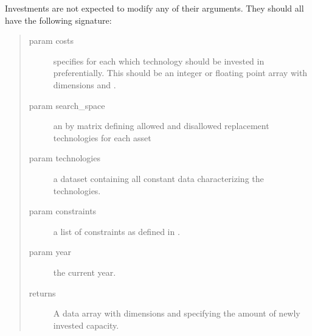 \documentclass[letterpaper,10pt,english]{sphinxmanual}
\begin{document}
Investments are not expected to modify any of their arguments. They should all
have the following signature:

\begin{sphinxVerbatim}[commandchars=\\\{\}]
 
     
     
     
     \PYG{p}{[}\PYG{p}{]}
     
  
\end{sphinxVerbatim}
\begin{quote}\begin{description}
\item[{param costs}] \leavevmode
specifies for each  which  technology should be invested
in preferentially. This should be an integer or floating point array with
dimensions  and .

\item[{param search\_space}] \leavevmode
an  by  matrix defining allowed and disallowed
replacement technologies for each asset

\item[{param technologies}] \leavevmode
a dataset containing all constant data characterizing the
technologies.

\item[{param constraints}] \leavevmode
a list of constraints as defined in .

\item[{param year}] \leavevmode
the current year.

\item[{returns}] \leavevmode
A data array with dimensions  and  specifying the amount
of newly invested capacity.

\end{description}\end{quote}
\end{document}
